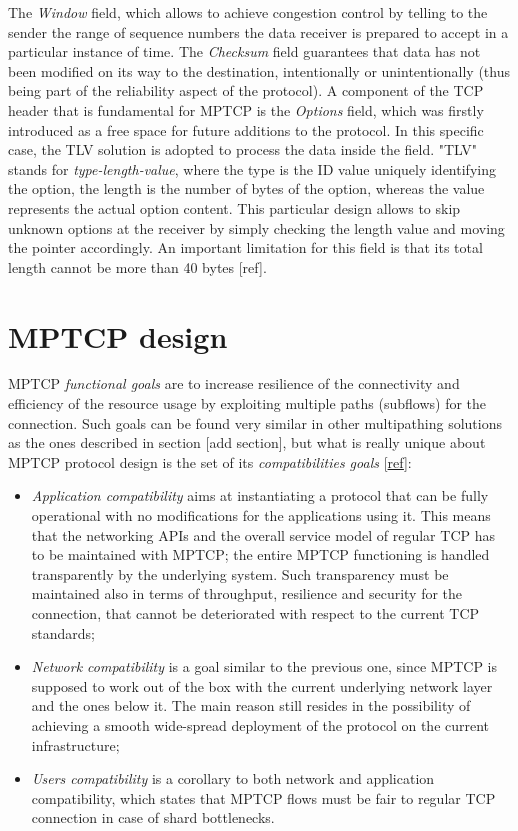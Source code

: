 The \textit{Window} field, which allows to achieve congestion control by telling to the sender the range of sequence numbers the data receiver is prepared to accept in a particular instance of time. The \textit{Checksum} field guarantees that data has not been modified on its way to the destination, intentionally or unintentionally (thus being part of the reliability aspect of the protocol). A component of the TCP header that is fundamental for MPTCP is the \textit{Options} field, which was firstly introduced as a free space for future additions to the protocol. In this specific case, the TLV solution is adopted to process the data inside the field. "TLV" stands for \textit{type-length-value}, where the type is the ID value uniquely identifying the option, the length is the number of bytes of the option, whereas the value represents the actual option content. This particular design allows to skip unknown options at the receiver by simply checking the length value and moving the pointer accordingly. An important limitation for this field is that its total length cannot be more than 40 bytes [ref].

\section{MPTCP design}
MPTCP \textit{functional goals} are to increase resilience of the connectivity and efficiency of the resource usage by exploiting multiple paths (subflows) for the connection.
Such goals can be found very similar in other multipathing solutions as the ones described in section [add section], but what is really unique about MPTCP protocol design is the set of its \textit{compatibilities goals} [\href{https://tools.ietf.org/html/rfc6182}{ref}]:

\begin{itemize}
  \item \textit{Application compatibility} aims at instantiating a protocol that can be fully operational with no modifications for the applications using it. This means that the networking APIs and the overall service model of regular TCP has to be maintained with MPTCP; the entire MPTCP functioning is handled transparently by the underlying system. Such transparency must be maintained also in terms of throughput, resilience and security for the connection, that cannot be deteriorated with respect to the current TCP standards;
  \item \textit{Network compatibility} is a goal similar to the previous one, since MPTCP is supposed to work out of the box with the current underlying network layer and the ones below it. The main reason still resides in the possibility of achieving a smooth wide-spread deployment of the protocol on the current infrastructure;
  \item \textit{Users compatibility} is a corollary to both network and application compatibility, which states that MPTCP flows must be fair to regular TCP connection in case of shard bottlenecks.
\end{itemize}


